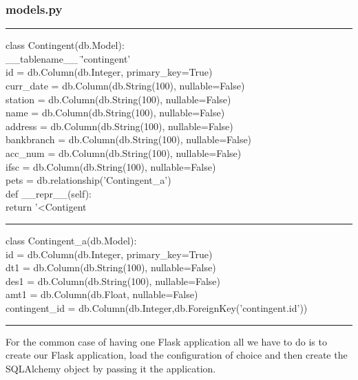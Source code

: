 \documentclass[journal,12pt,twocolumn]{IEEEtran}
\begin{document}
\subsubsection{\textbf{models.py}}
\begin{flushleft}
\hrule
class Contingent(db.Model): \\
\qquad    \_\_tablename\_\_ \= 'contingent'\\
\qquad    id = db.Column(db.Integer, primary\_key=True) \\
\qquad    curr\_date = db.Column(db.String(100), nullable=False) \\
\qquad    station = db.Column(db.String(100), nullable=False) \\
\qquad    name = db.Column(db.String(100), nullable=False) \\
\qquad    address = db.Column(db.String(100), nullable=False) \\
\qquad    bankbranch = db.Column(db.String(100), nullable=False) \\ 
\qquad    acc\_num = db.Column(db.String(100), nullable=False) \\
\qquad    ifsc = db.Column(db.String(100), nullable=False) \\
\qquad    pets = db.relationship('Contingent\_a') \\

\qquad    def \_\_repr\_\_(self): \\
\qquad\qquad        return '<Contigent %

\hrule
class Contingent\_a(db.Model): \\
\qquad    id = db.Column(db.Integer, primary\_key=True) \\
\qquad    dt1 = db.Column(db.String(100), nullable=False) \\
\qquad    des1 = db.Column(db.String(100), nullable=False)\\
\qquad    amt1 = db.Column(db.Float, nullable=False)\\
\qquad    contingent\_id = db.Column(db.Integer,db.ForeignKey('contingent.id'))\\
\hrule


\end{flushleft}
For the common case of having one Flask application all we have to do is to create our Flask application, load the configuration of choice and then create the SQLAlchemy object by passing it the application.\par
\end{document}
